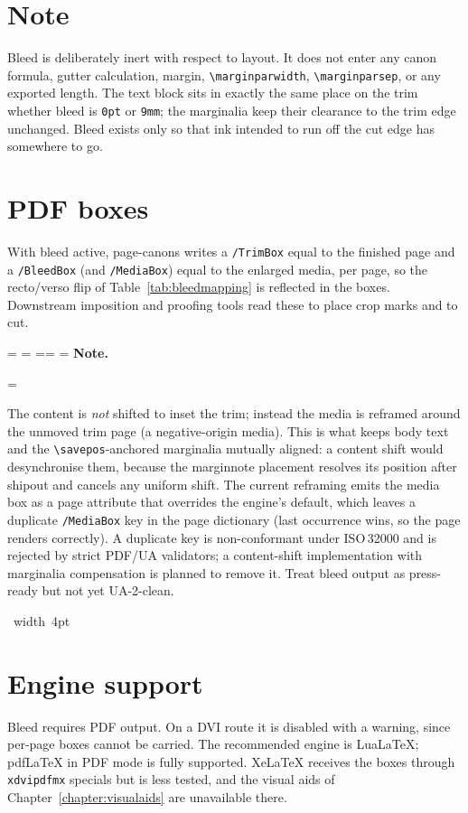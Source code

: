 \documentclass[11pt, twoside, openany]{book}
\makeatletter
\newcommand{\pkg}[1]{\textsf{#1}}
\newcommand{\cmd}[1]{\texttt{\textbackslash #1}}
\newcommand*{\cns@tag@artifact@begin}{}
\newcommand*{\cns@tag@artifact@end}{}
\newenvironment{TodoNote}[1][]{%
  \par\addvspace{0.5\baselineskip plus 2pt}%
  \setbox\cns@box=\vbox\bgroup
    \hsize=\linewidth
    \advance\hsize -10pt
    \linewidth=\hsize \columnwidth=\hsize
    \parindent=\z@
    \noindent\textbf{\sffamily Note\cns@ifnotempty{#1}{ \textmd{(#1)}}.}%
    \par\nobreak
    \@afterindentfalse\@afterheading
    \leftskip=\cns@indent\relax
    \ignorespaces
}{%
  \par
  \egroup
  \vbox{\hbox{%
    \cns@tag@artifact@begin\vrule width 4pt\cns@tag@artifact@end
    \hskip 6pt\relax
    \box\cns@box
  }}%
  \par\addvspace{0.5\baselineskip plus 2pt}%
}
\makeatother
\begin{document}
\section{Note}\label{sec:bleedinvariant}

Bleed is deliberately inert with respect to layout. It does not enter any canon formula, gutter calculation, margin, \cmd{marginparwidth}, \cmd{marginparsep}, or any exported length. The text block sits in exactly the same place on the trim whether bleed is \texttt{0pt} or \texttt{9mm}; the marginalia keep their clearance to the trim edge unchanged. Bleed exists only so that ink intended to run off the cut edge has somewhere to go.

\section{PDF boxes}\label{sec:bleedboxes}

With bleed active, \pkg{page-canons} writes a \texttt{/TrimBox} equal to the finished page and a \texttt{/BleedBox} (and \texttt{/MediaBox}) equal to the enlarged media, per page, so the recto/verso flip of Table~\ref{tab:bleedmapping} is reflected in the boxes. Downstream imposition and proofing tools read these to place crop marks and to cut.

\begin{TodoNote}
	The content is \emph{not} shifted to inset the trim; instead the media is reframed around the unmoved trim page (a negative-origin media). This is what keeps body text and the \cmd{savepos}-anchored marginalia mutually aligned: a content shift would desynchronise them, because the marginnote placement resolves its position after shipout and cancels any uniform shift. The current reframing emits the media box as a page attribute that overrides the engine's default, which leaves a duplicate \texttt{/MediaBox} key in the page dictionary (last occurrence wins, so the page renders correctly). A duplicate key is non-conformant under ISO\,32000 and is rejected by strict PDF/UA validators; a content-shift implementation with marginalia compensation is planned to remove it. Treat bleed output as press-ready but not yet UA-2-clean.
\end{TodoNote}

\section{Engine support}\label{sec:bleedengines}

Bleed requires PDF output. On a DVI route it is disabled with a warning, since per-page boxes cannot be carried. The recommended engine is Lua\LaTeX; pdf\LaTeX{} in PDF mode is fully supported. Xe\LaTeX{} receives the boxes through \texttt{xdvipdfmx} specials but is less tested, and the visual aids of Chapter~\ref{chapter:visualaids} are unavailable there.
\end{document}
